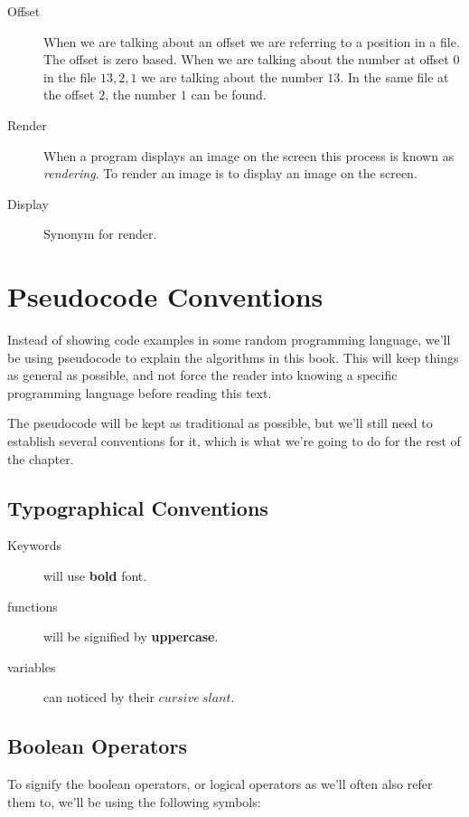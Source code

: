 \begin{description}
\item[Offset] When we are talking about an offset we are referring to
  a position in a file. The offset is zero based. When we are talking
  about the number at offset 0 in the file $13,2,1$ we are talking
  about the number $13$. In the same file at the offset $2$, the
  number $1$ can be found.


\item[Render] When a program displays an image on the screen this
  process is known as \textit{rendering}. To render an image is to
  display an image on the screen.

\item[Display] Synonym for render.

\end{description}

\section{Pseudocode Conventions}

Instead of showing code examples in some random programming language,
we'll be using pseudocode to explain the algorithms in this book. This
will keep things as general as possible, and not force the reader into
knowing a specific programming language before reading this text.

The pseudocode will be kept as traditional as possible, but we'll
still need to establish several conventions for it, which is what
we're going to do for the rest of the chapter.

\subsection{Typographical Conventions}

\begin{description}
\item[Keywords] will use \textbf{bold} font.
\item[functions] will be signified by \textbf{uppercase}.
\item[variables] can noticed by their $cursive\ slant$.
\end{description}

\subsection{Boolean Operators}
\label{sec:boolean-operators}

To signify the boolean operators, or logical operators as we'll often
also refer them to, we'll be using the following symbols:

